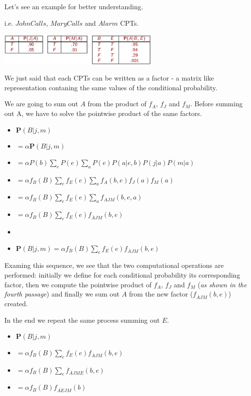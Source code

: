 Let's see an example for better understanding.
\begin{example}
    i.e. $JohnCalls$, $MaryCalls$ and $Alarm$ CPTs. \vspace{3.5pt}

    \begin{center}
        \includegraphics[width=0.6\textwidth]{img/img13.png}
    \end{center} \vspace{3.5pt}

    We just said that each CPTs can be written as a factor - a matrix like representation contaning the same values of the conditional probability. \vspace{3.5pt}

    We are going to sum out $A$ from the product of $f_A$, $f_J$ and $f_M$. Before summing out A, we have to solve the pointwise product of the same factors. \vspace{3.5pt}

    \begin{itemize}
        \renewcommand{\labelitemi}{}
        \item $\mathbf{P}(B|j,m)$
        \item $= \alpha \mathbf{P}(B|j, m)$
        \item $= \alpha P(b)\sum_{e}P(e)\sum_{a}P(e)P(a|e, b)P(j|a)P(m|a)$
        \item $= \alpha f_B(B) \sum_{e} f_E(e) \sum_{a} f_A(b, e) f_J(a) f_M(a)$
        \item $= \alpha f_B(B) \sum_{e} f_E(e) \sum_{a} f_{AJM}(b, e, a)$
        \item $= \alpha f_B(B) \sum_{e} f_E(e) f_{\overline{A}JM}(b, e)$
        \item 
        \item $\mathbf{P}(B|j,m) = \alpha f_B(B) \sum_{e} f_E(e) f_{\overline{A}JM}(b, e)$
    \end{itemize} \vspace{7pt}
    Examing this sequence, we see that the two computational operations are performed: initially we define for each conditional probability its corresponding factor,
    then we compute the pointwise product of $f_A$, $f_J$ and $f_M$ (\textit{as shown in the fourth passage}) and finally we sum out $A$ from the new factor ($f_{\overline{A}JM}(b, e)$)
    created. \vspace{7pt}

    In the end we repeat the same process summing out $E$.
    \begin{itemize}
        \renewcommand{\labelitemi}{}
        \item $\mathbf{P}(B|j,m)$
        \item $= \alpha f_B(B) \sum_{e} f_E(e) f_{\overline{A}JM}(b, e)$
        \item $= \alpha f_B(B) \sum_{e} f_{\overline{A}JME}(b, e)$
        \item $= \alpha f_B(B) f_{\overline{AE}JM}(b)$
    \end{itemize}
\end{example}
